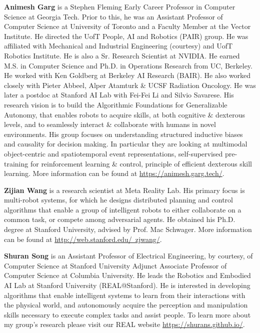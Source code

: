 \documentclass[10pt]{article} %
\begin{document}
\textbf{Animesh Garg} is a Stephen Fleming Early Career Professor in Computer Science at Georgia Tech. Prior to this, he was an Assistant Professor of Computer Science at University of Toronto and a Faculty Member at the Vector Institute. He directed the UofT People, AI and Robotics (PAIR) group. He was affiliated with Mechanical and Industrial Engineering (courtesy) and UofT Robotics Institute. He is also a Sr. Research Scientist at NVIDIA. He earned M.S. in Computer Science and Ph.D. in Operations Research from UC, Berkeley. He worked with Ken Goldberg at Berkeley AI Research (BAIR). He also worked closely with Pieter Abbeel, Alper Atamturk \& UCSF Radiation Oncology. He was later a postdoc at Stanford AI Lab with Fei-Fei Li and Silvio Savarese. His research vision is to build the Algorithmic Foundations for Generalizable Autonomy, that enables robots to acquire skills, at both cognitive \& dexterous levels, and to seamlessly interact \& collaborate with humans in novel environments. His group focuses on understanding structured inductive biases and causality for decision making. In particular they are looking at multimodal object-centric and spatiotemporal event representations, self-supervised pre-training for reinforcement learning \& control, principle of efficient dexterous skill learning. More information can be found at \href{https://animesh.garg.tech/}{https://animesh.garg.tech/}. 


\textbf{Zijian Wang} is a research scientist at Meta Reality Lab. His primary focus is multi-robot systems, for which he designs distributed planning and control algorithms that enable a group of intelligent robots to either collaborate on a common task, or compete among adversarial agents.  He obtained his Ph.D. degree at Stanford University, advised by Prof. Mac Schwager. More information can be found at \href{http://web.stanford.edu/~zjwang/}{http://web.stanford.edu/~zjwang/}. 


\textbf{Shuran Song} is an Assistant Professor of Electrical Engineering, by courtesy, of Computer Science at Stanford University Adjunct Associate Professor of Computer Science at Columbia University. He leads the Robotics and Embodied AI Lab at Stanford University (REAL@Stanford). He is interested in developing algorithms that enable intelligent systems to learn from their interactions with the physical world, and autonomously acquire the perception and manipulation skills necessary to execute complex tasks and assist people. To learn more about my group's research please visit our REAL website \href{https://shurans.github.io/}{https://shurans.github.io/}.
\end{document}
